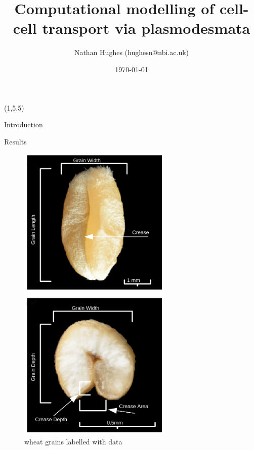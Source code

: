 \documentclass[final]{beamer}
\title{ Computational modelling of cell-cell transport via plasmodesmata }
\author{Nathan Hughes (hughesn@nbi.ac.uk)}
\date{\today}
\begin{document}
\begin{frame}{}

  \begin{textblock}{28}(1,5.5)

    \begin{block}{Introduction}



    \end{block}


    \begin{block}{Results}

      \begin{multicols}{2}
        \begin{figure}[htb]
          \centering
          \includegraphics[width=7.3cm]{collection2.png}
          \caption{\label{fig:real} wheat grains labelled with data}
        \end{figure}

        \columnbreak


\end{multicols}
\end{block}
\end{textblock}
\end{frame}
\end{document}
